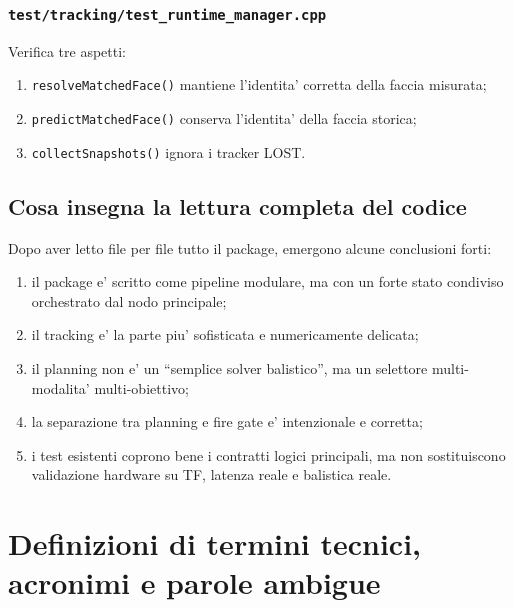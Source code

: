 \documentclass[11pt,a4paper]{article}
\newcommand{\code}[1]{\texttt{#1}}
\begin{document}
\subsubsection{\code{test/tracking/test\_runtime\_manager.cpp}}

Verifica tre aspetti:
\begin{enumerate}[leftmargin=1.4em]
  \item \code{resolveMatchedFace()} mantiene l'identita' corretta della faccia misurata;
  \item \code{predictMatchedFace()} conserva l'identita' della faccia storica;
  \item \code{collectSnapshots()} ignora i tracker LOST.
\end{enumerate}

\subsection{Cosa insegna la lettura completa del codice}

Dopo aver letto file per file tutto il package, emergono alcune conclusioni forti:
\begin{enumerate}[leftmargin=1.4em]
  \item il package e' scritto come pipeline modulare, ma con un forte stato condiviso orchestrato dal nodo principale;
  \item il tracking e' la parte piu' sofisticata e numericamente delicata;
  \item il planning non e' un ``semplice solver balistico'', ma un selettore multi-modalita' multi-obiettivo;
  \item la separazione tra planning e fire gate e' intenzionale e corretta;
  \item i test esistenti coprono bene i contratti logici principali, ma non sostituiscono validazione hardware su TF, latenza reale e balistica reale.
\end{enumerate}

\section{Definizioni di termini tecnici, acronimi e parole ambigue}
\end{document}

